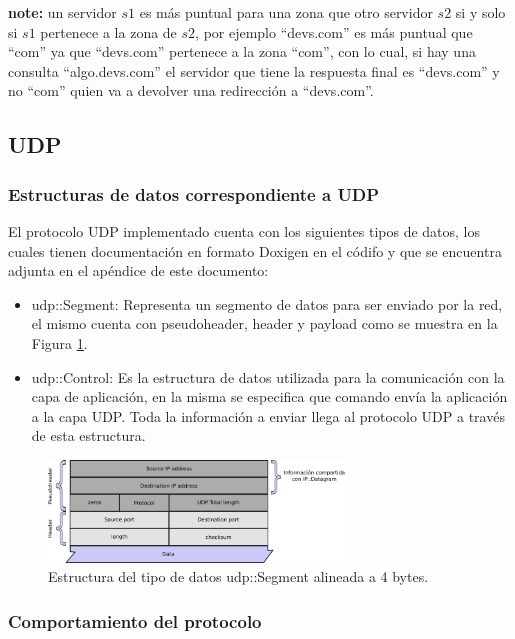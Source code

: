 \documentclass[10pt,a4paper]{article}
\begin{document}
\textbf{note: } un servidor $s1$ es más puntual para una zona que otro servidor $s2$ si y solo si $s1$ pertenece a la zona de $s2$, por ejemplo ``devs.com'' es más puntual que ``com'' ya que ``devs.com'' pertenece a la zona ``com'', con lo cual, si hay una consulta ``algo.devs.com'' el servidor que tiene la respuesta final es ``devs.com'' y no ``com'' quien va a devolver una redirección a ``devs.com''.

\subsection{UDP}

\subsubsection{Estructuras de datos correspondiente a UDP}

El protocolo UDP implementado cuenta con los siguientes tipos de datos, los cuales tienen documentación en formato Doxigen en el códifo y que se encuentra adjunta en el apéndice de este documento:

\begin{itemize}
\item udp::Segment: Representa un segmento de datos para ser enviado por la red, el mismo cuenta con pseudoheader, header y payload como se muestra en la Figura \ref{figure: udp segment}.
\item udp::Control: Es la estructura de datos utilizada para la comunicación con la capa de aplicación, en la misma se especifica que comando envía la aplicación a la capa UDP. Toda la información a enviar llega al protocolo UDP a través de esta estructura.
\end{itemize}

\begin{figure}[!htb]
    \centering
    \includegraphics[width = 0.7\textwidth]{img/png/UDP-Segment.png}
    \caption{Estructura del tipo de datos udp::Segment alineada a 4 bytes.}
    \label{figure: udp segment}
\end{figure}

\subsubsection{Comportamiento del protocolo}
\end{document}
